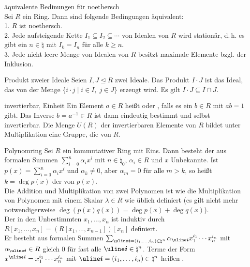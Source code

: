 \begin{Satz}{äquivalente Bedinungen für noethersch} \\
    Sei $R$ ein Ring.
    Dann sind folgende Bedingungen äquivalent: \\
    1. $R$ ist noethersch. \\
    2. Jede aufsteigende Kette $I_1 \subseteq I_2 \subseteq \dotsb$ von Idealen
    von $R$ wird stationär, d.\,h. es gibt ein $n \in \natural$ mit $I_k = I_n$
    für alle $k \ge n$. \\
    3. Jede nicht-leere Menge von Idealen von $R$ besitzt maximale
    Elemente bzgl. der Inklusion.
\end{Satz}

\begin{Def}{Produkt zweier Ideale}
    Seien $I, J \trianglelefteq R$ zwei Ideale.
    Das Produkt $I \cdot J$ ist das Ideal, das von der Menge
    $\{i \cdot j \;|\; i \in I,\; j \in J\}$ erzeugt wird.
    Es gilt $I \cdot J \subseteq I \cap J$.
\end{Def}

\begin{Def}{invertierbar, Einheit}
    Ein Element $a \in R$ heißt  oder ,
    falls es ein $b \in R$ mit $ab = 1$ gibt.
    Das Inverse $b = a^{-1} \in R$ ist dann eindeutig bestimmt und selbst
    invertierbar.
    Die Menge $U(R)$ der invertierbaren Elemente von $R$ bildet unter
    Multiplikation eine Gruppe, die  von $R$.
\end{Def}

\begin{Def}{Polynomring}
    Sei $R$ ein kommutativer Ring mit Eins.
    Dann besteht der  aus formalen Summen
    $\sum_{i=0}^n \alpha_i x^i$ mit $n \in \natural_0$, $\alpha_i \in R$ und
    $x$ Unbekannte.
    Ist $p(x) = \sum_{i=0}^n \alpha_i x^i$ und $\alpha_k \not= 0$,
    aber $\alpha_m = 0$ für alle $m > k$, so heißt $k = \deg p(x)$ der
     von $p(x)$. \\
    Die Addition und Multiplikation von zwei Polynomen ist wie
    die Multiplikation von Polynomen mit einem Skalar $\lambda \in R$
    wie üblich definiert
    (es gilt nicht mehr notwendigerweise
    $\deg(p(x)q(x)) = \deg p(x) + \deg q(x)$). \\
    Der  in den Unbestimmten
    $x_1, \dotsc, x_n$ ist induktiv durch \\
    $R[x_1, \dotsc, x_n] = (R[x_1, \dotsc, x_{n-1}])[x_n]$ definiert. \\
    Er besteht aus formalen Summen
    $\sum_{\mi{i} = (i_1, \dotsc, i_n) \in \natural^n}
    \alpha_{\mi{i}} x_1^{i_1} \dotsm x_n^{i_n}$
    mit $\alpha_{\mi{i}} \in R$ gleich $0$ für fast alle
    $\mi{i} \in \natural^n$.
    Terme der Form $x^{\mi{i}} = x_1^{i_1} \dotsm x_n^{i_n}$
    mit $\mi{i} = (i_1, \dotsc, i_n) \in \natural^n$ heißen
    .
\end{Def}

